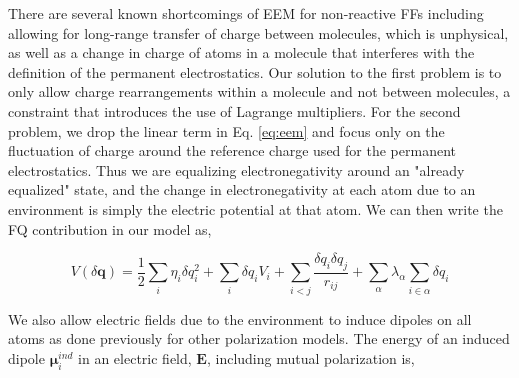 \documentclass[journal=jctcce,manuscript=article]{achemso}
\begin{document}
There are several known shortcomings of EEM for non-reactive FFs including allowing for long-range transfer of charge between molecules, which is unphysical,\cite{chen2007qtpie,chen2008unified}
as well as a change in charge of atoms in a molecule that interferes with the definition of the permanent electrostatics. Our solution to the first problem is to only allow charge rearrangements within a molecule and not between molecules, a constraint that introduces the use of Lagrange multipliers. For the second problem, we drop the linear term in Eq. \ref{eq:eem} and focus only on the fluctuation of charge around the reference charge used for the permanent electrostatics. Thus we are equalizing electronegativity around an "already
equalized" state, and the change in electronegativity at each atom due to an environment is simply
the electric potential at that atom. We can then write the FQ contribution in our
model as,

\begin{equation}
  V(\delta \bm{q})=\frac12\sum_i \eta_i \delta q_i^2 + \sum_i \delta q_i V_i + \sum_{i<j}\frac{\delta q_i \delta q_j}{r_{ij}} + \sum_{\alpha}\lambda_\alpha \sum_{i\in\alpha}\delta q_{i}
  \label{eq:fq}
\end{equation}

We also allow electric fields due to the environment to induce dipoles on all atoms as done previously for other polarization models. The energy of an induced dipole $\bm{\mu}_i^{ind}$ in an electric field, $\bm{E}$, including mutual polarization is,
\end{document}
